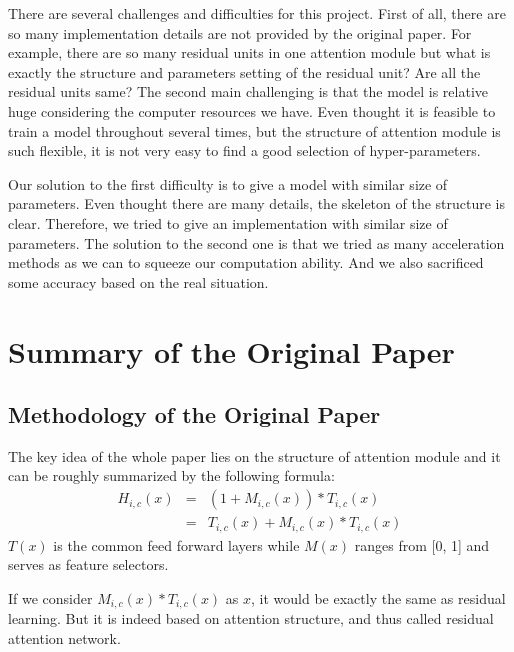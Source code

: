 \documentclass{article}
\begin{document}
\newpage
\begin{multicols}{2}
There are several challenges and difficulties for this project. First of all, there are so many implementation details are not provided by the original paper. For example, there are so many residual units in one attention module but what is exactly the structure and parameters setting of the residual unit? Are all the residual units same? The second main challenging is that the model is relative huge considering the computer resources we have. Even thought it is feasible to train a model throughout several times, but the structure of attention module is such flexible, it is not very easy to find a good selection of hyper-parameters. 

Our solution to the first difficulty is to give a model with similar size of parameters. Even thought there are many details, the skeleton of the structure is clear. Therefore, we tried to give an implementation with similar size of parameters. The solution to the second one is that we tried as many acceleration methods as we can to squeeze our computation ability. And we also sacrificed some accuracy based on the real situation. 
\section{Summary of the Original Paper}
\subsection{Methodology of the Original Paper}
The key idea of the whole paper lies on the structure of attention module and it can be roughly summarized by the following formula:
\begin{eqnarray*}
H_{i,c}(x)&=&(1+M_{i,c}(x))*T_{i, c}(x) \\
&=&T_{i, c}(x) + M_{i,c}(x)*T_{i, c}(x)
\label{eqn:attention_module}
\end{eqnarray*}
$T(x)$ is the common feed forward layers while $M(x)$ ranges from [0, 1] and serves as feature selectors. 

If we consider $M_{i,c}(x)*T_{i, c}(x)$ as $x$, it would be exactly the same as residual learning. But it is indeed based on attention structure, and thus called residual attention network.


\end{multicols}
\end{document}
